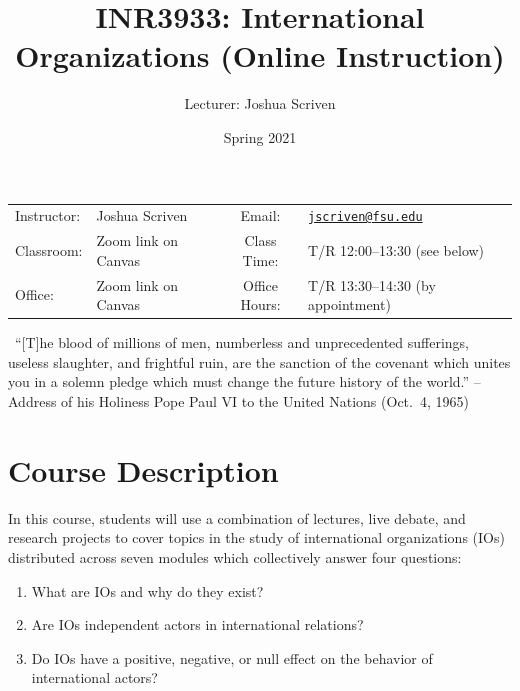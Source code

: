 \documentclass[10pt,]{article}
\title{INR3933: International Organizations \textbar{} (Online
Instruction)}
\author{Lecturer: Joshua Scriven}
\date{Spring 2021}
\providecommand{\tightlist}{%
  \setlength{\itemsep}{0pt}\setlength{\parskip}{0pt}}
\begin{document}
		\maketitle
	

		\thispagestyle{firststyle}

\begin{center}
\begin{tabular}{llccll}
\hline
\rowcolor{Gray}
Instructor: & Joshua Scriven &          \hspace{3cm}           &
Email: & \href{mailto:jscriven@fsu.edu}{\nolinkurl{jscriven@fsu.edu}}\\

Classroom: &  Zoom link on Canvas & &
Class Time: & T/R 12:00--13:30 (see below)\\
Office: & Zoom link on Canvas & &
Office Hours: & T/R 13:30--14:30 (by appointment)\\
\hline
\end{tabular}

\begin{minipage}{5.2in}
  \begin{flushleft}
    {\color{Gray}{\RectangleBold}} ~{\footnotesize ``{[}T{]}he blood of
millions of men, numberless and unprecedented sufferings, useless
slaughter, and frightful ruin, are the sanction of the covenant which
unites you in a solemn pledge which must change the future history of
the world.'' --Address of his Holiness Pope Paul VI to the United
Nations (Oct.~4, 1965)}\newline
  \end{flushleft}
\end{minipage}


\end{center}

\vspace{2mm}


\hypertarget{course-description}{%
\section{Course Description}\label{course-description}}

In this course, students will use a combination of lectures, live
debate, and research projects to cover topics in the study of
international organizations (IOs) distributed across seven modules which
collectively answer four questions:

\begin{enumerate}
\def\labelenumi{\arabic{enumi}.}
\tightlist
\item
  What are IOs and why do they exist?
\item
  Are IOs independent actors in international relations?
\item
  Do IOs have a positive, negative, or null effect on the behavior of
  international actors?
\end{enumerate}
\end{document}
